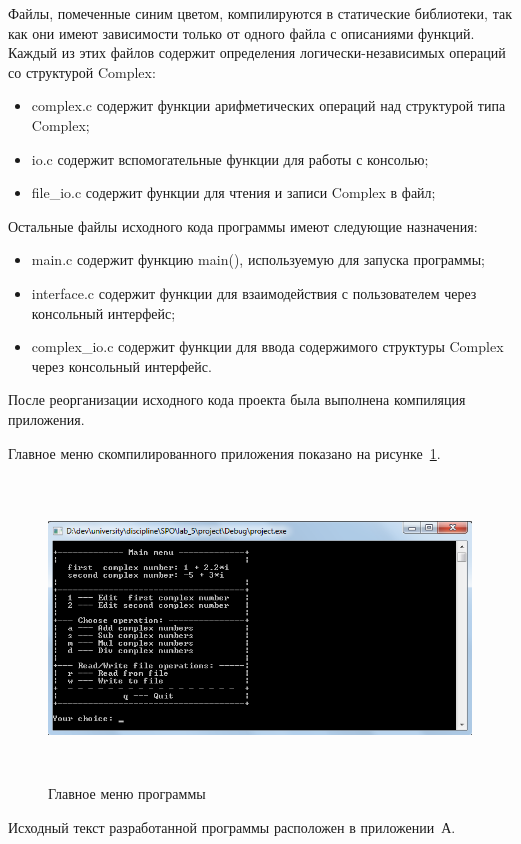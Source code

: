 Файлы, помеченные синим цветом, компилируются в статические библиотеки,
так как они имеют зависимости только от одного файла с описаниями функций.
Каждый из этих файлов содержит определения логически-независимых операций со 
структурой Complex:

\begin{itemize}
  \item complex.c содержит функции арифметических операций над структурой типа Complex;
  \item io.c содержит вспомогательные функции для работы с консолью;
  \item file\_io.c содержит функции для чтения и записи Complex в файл;
\end{itemize} 

Остальные файлы исходного кода программы имеют следующие назначения:
\begin{itemize}
  \item main.c содержит функцию main(), используемую для запуска программы;
  \item interface.c содержит функции для взаимодействия с пользователем через
    консольный интерфейс;
  \item complex\_io.c содержит функции для ввода содержимого структуры Complex через
    консольный интерфейс.
\end{itemize}

После реорганизации исходного кода проекта была выполнена компиляция приложения.

Главное меню скомпилированного приложения показано на рисунке~\ref{fig:main_menu}.

\begin{figure}[htbp]
  \centering
  \includegraphics[width=150mm,height=80mm]{img/main_menu}
  \caption{Главное меню программы}\label{fig:main_menu}
\end{figure}

Исходный текст разработанной программы расположен в приложении~А.

\newpage